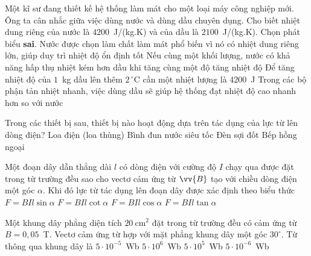 	\begin{ex}%
		Một kĩ sư đang thiết kế hệ thống làm mát cho một loại máy công nghiệp mới. Ông ta cân nhắc giữa việc dùng nước và dùng dầu chuyên dụng. Cho biết nhiệt dung riêng của nước là $4200$~J/(kg.K) và của dầu là $2100$~J/(kg.K). Chọn phát biểu \textbf{sai}.
		\choice
		{Nước được chọn làm chất làm mát phổ biến vì nó có nhiệt dung riêng lớn, giúp duy trì nhiệt độ ổn định tốt}
		{\True Nếu cùng một khối lượng, nước có khả năng hấp thụ nhiệt kém hơn dầu khi tăng cùng một độ tăng nhiệt độ}
		{Để tăng nhiệt độ của $1$~kg dầu lên thêm $2\,^\circ\text{C}$ cần một nhiệt lượng là $4200$~J}
		{Trong các bộ phận tản nhiệt nhanh, việc dùng dầu sẽ giúp hệ thống đạt nhiệt độ cao nhanh hơn so với nước}
	\end{ex}

	\begin{ex}%
		Trong các thiết bị sau, thiết bị nào hoạt động dựa trên tác dụng của lực từ lên dòng điện?
		\choice
		{\True Loa điện (loa thùng)}
		{Bình đun nước siêu tốc}
		{Đèn sợi đốt}
		{Bếp hồng ngoại}
	\end{ex}

	\begin{ex}%
		Một đoạn dây dẫn thẳng dài $l$ có dòng điện với cường độ $I$ chạy qua được đặt trong từ trường đều sao cho vectơ cảm ứng từ $\vv{B}$ tạo với chiều dòng điện một góc $\alpha$. Khi đó lực từ tác dụng lên đoạn dây được xác định theo biểu thức
		\choice
		{\True $F=BIl\sin\alpha$}
		{$F=BIl\cot\alpha$}
		{$F=BIl\cos\alpha$}
		{$F=BIl\tan\alpha$}
	\end{ex}

	\begin{ex}%
		Một khung dây phẳng diện tích $20~\text{cm}^2$ đặt trong từ trường đều có cảm ứng từ $B=0{,}05$~T. Vectơ cảm ứng từ hợp với mặt phẳng khung dây một góc $30^\circ$. Từ thông qua khung dây là
		\choice
		{\True $5\cdot 10^{-5}$~Wb}
		{$5\cdot 10^{6}$~Wb}
		{$5\cdot 10^{5}$~Wb}
		{$5\cdot 10^{-6}$~Wb}
	\end{ex}

